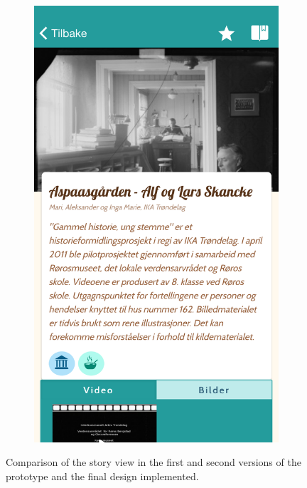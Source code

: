 \begin{figure}
\begin{subfigure}[h]{0.3\textwidth}
		\includegraphics[width=\textwidth]{fig/screenshot_story}
	\end{subfigure}
	\caption{Comparison of the story view in the first and second versions of the prototype and the final design implemented.}
	\label{Fig:prototype}
\end{figure}

